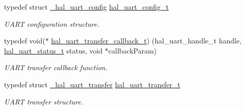 \begin{DoxyCompactItemize}
typedef struct \mbox{\hyperlink{struct__hal__uart__config}{\+\_\+hal\+\_\+uart\+\_\+config}} \mbox{\hyperlink{group___u_a_r_t___adapter_ga1545cbd3c961cbe725ed2a75ffc5a999}{hal\+\_\+uart\+\_\+config\+\_\+t}}
\begin{DoxyCompactList}\small\item\em U\+A\+RT configuration structure. \end{DoxyCompactList}\item 
\mbox{\label{group___u_a_r_t___adapter_ga3ec04aac6c3adbcaeec9a593ebf0f9be}} 
typedef void($\ast$ \mbox{\hyperlink{group___u_a_r_t___adapter_ga3ec04aac6c3adbcaeec9a593ebf0f9be}{hal\+\_\+uart\+\_\+transfer\+\_\+callback\+\_\+t}}) (hal\+\_\+uart\+\_\+handle\+\_\+t handle, \mbox{\hyperlink{group___u_a_r_t___adapter_ga352ee9bdc398eba4262ca7656f9c5e50}{hal\+\_\+uart\+\_\+status\+\_\+t}} status, void $\ast$callback\+Param)
\begin{DoxyCompactList}\small\item\em U\+A\+RT transfer callback function. \end{DoxyCompactList}\item 
\mbox{\label{group___u_a_r_t___adapter_gae828850e160c8cac564844089431e46e}} 
typedef struct \mbox{\hyperlink{struct__hal__uart__transfer}{\+\_\+hal\+\_\+uart\+\_\+transfer}} \mbox{\hyperlink{group___u_a_r_t___adapter_gae828850e160c8cac564844089431e46e}{hal\+\_\+uart\+\_\+transfer\+\_\+t}}
\begin{DoxyCompactList}\small\item\em U\+A\+RT transfer structure. \end{DoxyCompactList}\end{DoxyCompactItemize}
